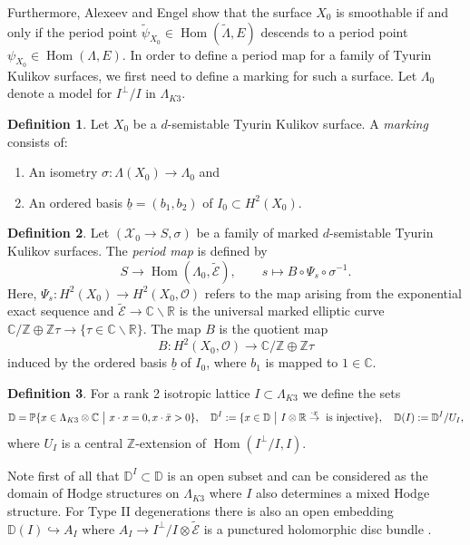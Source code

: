 \documentclass[a4paper]{amsart}
\theoremstyle{definition}
\newtheorem{defn}{Definition}[section]
\theoremstyle{plain}
\theoremstyle{remark}
\newcommand{\PS}{\mathbb{P}}
\newcommand{\Z}{\mathbb{Z}}
\newcommand{\C}{\mathbb{C}}
\newcommand{\D}{\mathbb{D}}
\newcommand{\R}{\mathbb{R}}
\begin{document}
Furthermore, Alexeev and Engel \cite[Prop. 4.4]{AE23} show that the surface $X_0$ is smoothable if and only if the period point $\widetilde{\psi}_{X_0} \in \operatorname{Hom}(\widetilde{\Lambda},E)$ descends to a period point $\psi_{X_0}\in \operatorname{Hom}(\Lambda,E)$. In order to define a period map for a family of Tyurin Kulikov surfaces, we first need to define a marking for such a surface. Let $\Lambda_0$ denote a model for $I^\perp /I$ in $\Lambda_{K3}$. %

\begin{defn}\label{def:marking Kulikov surface}
Let $X_0$ be a $d$-semistable Tyurin Kulikov surface. A \emph{marking} consists of:
\begin{enumerate}
    \item An isometry $\sigma:\Lambda(X_0)\rightarrow \Lambda_0$ and
    \item An ordered basis $\underline{b}=(b_1,b_2)$ of $I_0\subset H^2(X_0)$.
\end{enumerate}
\end{defn}

\begin{defn}\label{def:period map family of Kulikov surfaces}
Let $(\mathcal{X}_0\rightarrow S,\sigma)$ be a family of marked $d$-semistable Tyurin Kulikov surfaces. The \emph{period map} is defined by 
$$S\rightarrow \operatorname{Hom}(\Lambda_0,\widetilde{\mathcal{E}}), \qquad s\mapsto B\circ\Psi_s\circ\sigma^{-1}.$$
Here, $\Psi_s:H^2(X_0)\rightarrow H^2(X_0,\mathcal{O})$ refers to the map arising from the exponential exact sequence and $\widetilde{\mathcal{E}}\rightarrow \C \backslash \R$ is the universal marked elliptic curve $\C/\Z \oplus \Z\tau\rightarrow \{\tau\in \C\backslash\R\}$. The map $B$ is the quotient map
$$B:H^2(X_0,\mathcal{O})\rightarrow \C/\Z\oplus\Z\tau$$
induced by the ordered basis $\underline{b}$ of $I_0$, where $b_1$ is mapped to $1\in\C$.
\end{defn}

\begin{defn}
For a rank 2 isotropic lattice $I \subset \Lambda_{K3}$ we define the sets 
$$\D = \PS\{x \in \Lambda_{K3}\otimes\C \text{ }\big{|}\text{ } x\cdot x=0,x\cdot\bar{x}>0\},\quad
\D^I:=\{ x\in\D \text{ }\big{|} \text{ } I\otimes\R\overset{\cdot x}{\rightarrow} \text{ is injective}\},  \quad \D(I):=\D^I/U_I,$$
where $U_I$ is a central $\Z$-extension of $\operatorname{Hom}(I^\perp/I,I)$. 
\end{defn}

Note first of all that $\D^I\subset\D$ is an open subset and can be considered as the domain of Hodge structures on $\Lambda_{K3}$ where $I$ also determines a mixed Hodge structure. For Type II degenerations there is also an open embedding $\D(I)\hookrightarrow A_I$ where $A_I\rightarrow I^\perp/I\otimes\widetilde{\mathcal{E}}$ is a punctured holomorphic disc bundle \cite[Prop. 4.13]{AE23}.
\end{document}
